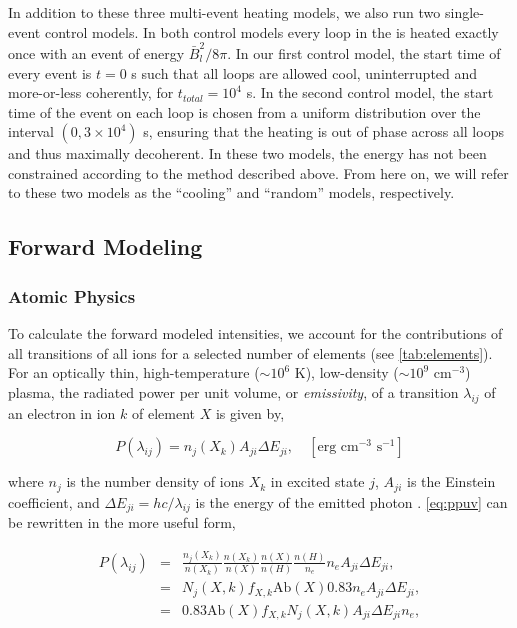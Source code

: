 In addition to these three multi-event heating models, we also run two single-event control models. In both control models every loop in the \AR{} is heated exactly once with an event of energy $\bar{B}_l^2/8\pi$. In our first control model, the start time of every event is $t=0$ s such that all loops are allowed cool, uninterrupted and more-or-less coherently, for $t_{total}=10^4$ s. In the second control model, the start time of the event on each loop is chosen from a uniform distribution over the interval $(0, 3\times10^4)$ s, ensuring that the heating is out of phase across all loops and thus maximally decoherent. In these two models, the energy has not been constrained according to the method described above. From here on, we will refer to these two models as the ``cooling'' and ``random'' models, respectively.

\subsection{Forward Modeling}\label{forward}

\subsubsection{Atomic Physics}\label{atomic}



To calculate the forward modeled intensities, we account for the contributions of all transitions of all ions for a selected number of elements (see \autoref{tab:elements}). For an optically thin, high-temperature ($\sim10^6$ K), low-density ($\sim10^9$ cm$^{-3}$) plasma, the radiated power per unit volume, or \textit{emissivity}, of a transition $\lambda_{ij}$ of an electron in ion $k$ of element $X$ is given by,

\begin{equation}
    \label{eq:ppuv}
    P(\lambda_{ij}) = n_j(X_k)A_{ji}\Delta E_{ji},\quad[\text{erg cm}^{-3}\text{ s}^{-1}]
\end{equation}

where $n_j$ is the number density of ions $X_k$ in excited state $j$, $A_{ji}$ is the Einstein coefficient, and $\Delta E_{ji}=hc/\lambda_{ij}$ is the energy of the emitted photon  \citep[see][]{mason_spectroscopic_1994,bradshaw_collisional_2013}. \autoref{eq:ppuv} can be rewritten in the more useful form,

\begin{eqnarray*}
    P(\lambda_{ij}) &=& \frac{n_j(X_k)}{n(X_k)}\frac{n(X_k)}{n(X)}\frac{n(X)}{n(H)}\frac{n(H)}{n_e}n_eA_{ji}\Delta E_{ji}, \\
    &=& N_j(X,k) f_{X,k} \mathrm{Ab}(X) 0.83 n_e A_{ji} \Delta E_{ji}, \\
    &=& 0.83 \mathrm{Ab}(X) f_{X,k} N_j(X,k) A_{ji} \Delta E_{ji} n_e,
\end{eqnarray*}

